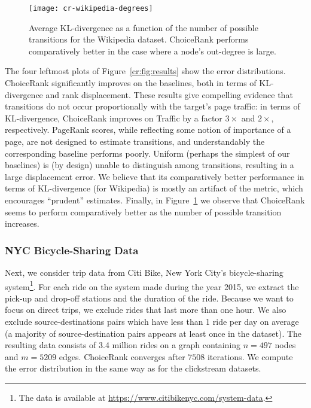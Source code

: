 \begin{figure}[t]
  \centering
  \texttt{[image: cr-wikipedia-degrees]}
  \caption{
Average KL-divergence as a function of the number of possible transitions for the Wikipedia dataset.
ChoiceRank performs comparatively better in the case where a node's out-degree is large.
}
  \label{cr:fig:wpdegs}
\end{figure}

The four leftmost plots of Figure~\ref{cr:fig:results} show the error distributions.
ChoiceRank significantly improves on the baselines, both in terms of KL-divergence and rank displacement.
These results give compelling evidence that transitions do not occur proportionally with the target's page traffic: in terms of KL-divergence, ChoiceRank improves on Traffic by a factor $3\times$ and $2\times$, respectively.
PageRank scores, while reflecting some notion of importance of a page, are not designed to estimate transitions, and understandably the corresponding baseline performs poorly.
Uniform (perhaps the simplest of our baselines) is (by design) unable to distinguish among transitions, resulting in a large displacement error.
We believe that its comparatively better performance in terms of KL-divergence (for Wikipedia) is mostly an artifact of the metric, which encourages ``prudent'' estimates.
Finally, in Figure~\ref{cr:fig:wpdegs} we observe that ChoiceRank seems to perform comparatively better as the number of possible transition increases.


\subsubsection{NYC Bicycle-Sharing Data}

Next, we consider trip data from Citi Bike, New York City's bicycle-sharing system\footnote{The data is available at \url{https://www.citibikenyc.com/system-data}.}.
For each ride on the system made during the year 2015, we extract the pick-up and drop-off stations and the duration of the ride.
Because we want to focus on direct trips, we exclude rides that last more than one hour.
We also exclude source-destinations pairs which have less than 1 ride per day on average (a majority of source-destination pairs appears at least once in the dataset).
The resulting data consists of \num{3.4} million rides on a graph containing $n = \num{497}$ nodes and $m = \num{5209}$ edges.
ChoiceRank converges after $\num{7508}$ iterations.
We compute the error distribution in the same way as for the clickstream datasets.

